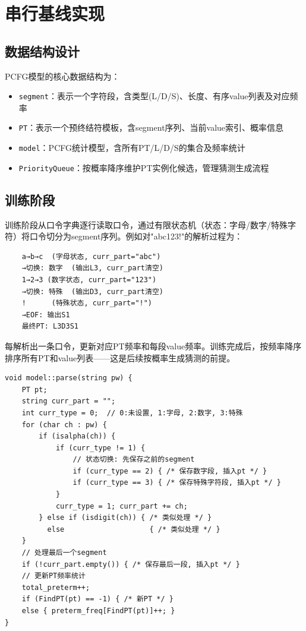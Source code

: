 \documentclass[12pt,a4paper]{ctexart}
\begin{document}
\section{串行基线实现}

\subsection{数据结构设计}

PCFG模型的核心数据结构为：

\begin{itemize}[nosep]
    \item \texttt{segment}：表示一个字符段，含类型(L/D/S)、长度、有序value列表及对应频率
    \item \texttt{PT}：表示一个预终结符模板，含segment序列、当前value索引、概率信息
    \item \texttt{model}：PCFG统计模型，含所有PT/L/D/S的集合及频率统计
    \item \texttt{PriorityQueue}：按概率降序维护PT实例化候选，管理猜测生成流程
\end{itemize}

\subsection{训练阶段}

训练阶段从口令字典逐行读取口令，通过有限状态机（状态：字母/数字/特殊字符）将口令切分为segment序列。例如对"abc123!"的解析过程为：

\begin{verbatim}
    a→b→c  (字母状态, curr_part="abc")
    →切换: 数字  (输出L3, curr_part清空)
    1→2→3 (数字状态, curr_part="123")
    →切换: 特殊  (输出D3, curr_part清空)
    !      (特殊状态, curr_part="!")
    →EOF: 输出S1
    最终PT: L3D3S1
\end{verbatim}

每解析出一条口令，更新对应PT频率和每段value频率。训练完成后，按频率降序排序所有PT和value列表——这是后续按概率生成猜测的前提。

\begin{lstlisting}[caption={model::parse — 口令解析核心逻辑},label=lst:parse]
void model::parse(string pw) {
    PT pt;
    string curr_part = "";
    int curr_type = 0;  // 0:未设置, 1:字母, 2:数字, 3:特殊
    for (char ch : pw) {
        if (isalpha(ch)) {
            if (curr_type != 1) {
                // 状态切换: 先保存之前的segment
                if (curr_type == 2) { /* 保存数字段, 插入pt */ }
                if (curr_type == 3) { /* 保存特殊字符段, 插入pt */ }
            }
            curr_type = 1; curr_part += ch;
        } else if (isdigit(ch)) { /* 类似处理 */ }
          else                    { /* 类似处理 */ }
    }
    // 处理最后一个segment
    if (!curr_part.empty()) { /* 保存最后一段, 插入pt */ }
    // 更新PT频率统计
    total_preterm++;
    if (FindPT(pt) == -1) { /* 新PT */ }
    else { preterm_freq[FindPT(pt)]++; }
}
\end{lstlisting}
\end{document}
